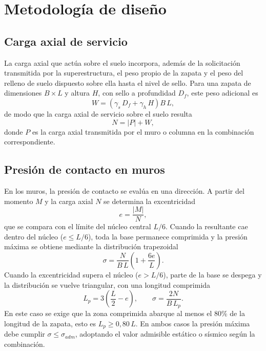\section{Metodología de diseño}

\subsection{Carga axial de servicio}
La carga axial que actúa sobre el suelo incorpora, además de la solicitación transmitida por la superestructura, el peso propio de la zapata y el peso del relleno de suelo dispuesto sobre ella hasta el nivel de sello. Para una zapata de dimensiones $B \times L$ y altura $H$, con sello a profundidad $D_f$, este peso adicional es
\begin{equation}
W = \left( \gamma_s \, D_f + \gamma_h \, H \right) B \, L,
\end{equation}
de modo que la carga axial de servicio sobre el suelo resulta
\begin{equation}
N = |P| + W,
\end{equation}
donde $P$ es la carga axial transmitida por el muro o columna en la combinación correspondiente.

\subsection{Presión de contacto en muros}
En los muros, la presión de contacto se evalúa en una dirección. A partir del momento $M$ y la carga axial $N$ se determina la excentricidad
\begin{equation}
e = \frac{|M|}{N},
\end{equation}
que se compara con el límite del núcleo central $L/6$. Cuando la resultante cae dentro del núcleo ($e \le L/6$), toda la base permanece comprimida y la presión máxima se obtiene mediante la distribución trapezoidal
\begin{equation}
\sigma = \frac{N}{B\,L}\left( 1 + \frac{6e}{L} \right).
\end{equation}
Cuando la excentricidad supera el núcleo ($e > L/6$), parte de la base se despega y la distribución se vuelve triangular, con una longitud comprimida
\begin{equation}
L_p = 3\left( \frac{L}{2} - e \right), \qquad \sigma = \frac{2N}{B\,L_p}.
\end{equation}
En este caso se exige que la zona comprimida abarque al menos el 80\% de la longitud de la zapata, esto es $L_p \ge 0,80\,L$. En ambos casos la presión máxima debe cumplir $\sigma \le \sigma_{adm}$, adoptando el valor admisible estático o sísmico según la combinación.

